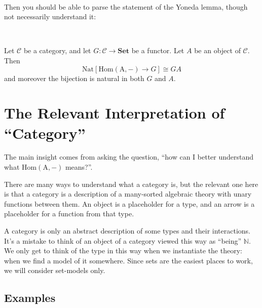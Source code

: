 \documentclass[11pt]{amsart}
\newcommand{\homfrom}[1]{\mathrm{Hom\left(#1, -\right)}}
\newcommand{\Set}{\mathbf{Set}}
\newcommand{\Nat}{\mathrm{Nat}}
\begin{document}
    \

    Then you should be able to parse the statement of the Yoneda lemma, though not necessarily understand it:

    \

    \begin{thm}
        Let $\mathcal{C}$ be a category, and let $G: \mathcal{C} \to \Set$ be a functor.
        Let $A$ be an object of $\mathcal{C}$.
        Then $$\Nat [\homfrom{A} \to G ] \cong G A$$
        and moreover the bijection is natural in both $G$ and $A$.
    \end{thm}

    \section{The Relevant Interpretation of ``Category''}

    The main insight comes from asking the question, ``how can I better understand what $\homfrom{A}$ means?''.

    There are many ways to understand what a category is, but the relevant one here is that a category is a description of a many-sorted algebraic theory with unary functions between them.
    An object is a placeholder for a type, and an arrow is a placeholder for a function from that type.

    A category is only an abstract description of some types and their interactions.
    It's a mistake to think of an object of a category viewed this way as ``being'' $\mathbb{N}$.
    We only get to think of the type in this way when we instantiate the theory: when we find a model of it somewhere.
    Since sets are the easiest places to work, we will consider set-models only.

    \subsection{Examples}
\end{document}
